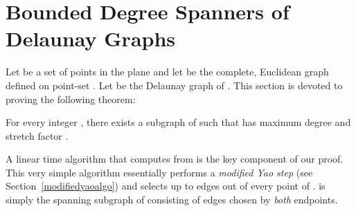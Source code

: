 \documentclass{stacs_proc}
\theoremstyle{plain}\newtheorem{satz}[thm]{Satz}
\begin{document}
\section{Bounded Degree Spanners of Delaunay Graphs}
\label{euclidean} 

Let  be a set of points in the plane and let 
be the complete, Euclidean graph defined on point-set . Let  be the
Delaunay graph of . This section is devoted to proving the following
theorem:

\begin{theorem}
\label{maintheorem} For every integer , there exists a
subgraph  of  such that  has maximum degree  and
stretch factor .
\end{theorem}

A linear time algorithm that computes  from  is the key
component of our proof. This very simple algorithm essentially
performs a {\em modified Yao step} (see
Section~\ref{modifiedyaoalgo}) and selects up to  edges out of
every point of .  is simply the spanning subgraph of  consisting
of edges chosen by {\em both} endpoints.
\end{document}
